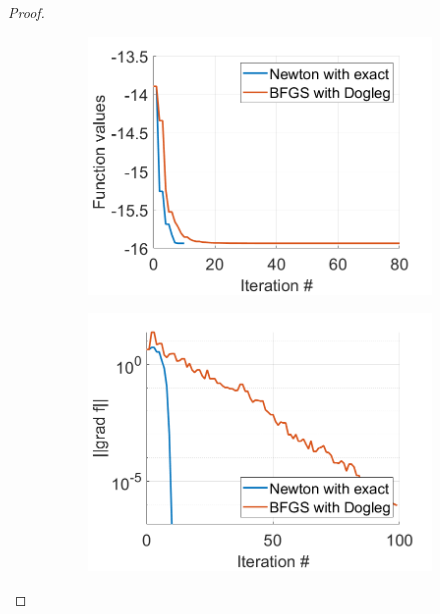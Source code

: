 \documentclass[12pt]{report}
\begin{document}
\begin{problem}
\begin{proof}
\begin{figure}[H]
    \label{fig4}
\end{figure}
\begin{figure}[H]
    \begin{subfigure}[b]{0.5\linewidth}
        \centering
        \includegraphics[width=\linewidth]{images/3-2-fun.png}
        \caption{}
        \label{fig5:a}
        \vspace{4ex}
    \end{subfigure}%
    \begin{subfigure}[b]{0.5\linewidth}
        \centering
        \includegraphics[width=\linewidth]{images/3-2-grad.png}
        \caption{}
        \label{fig5:b}
        \vspace{4ex}
    \end{subfigure}

\end{figure}
\end{proof}
\end{problem}
\end{document}

